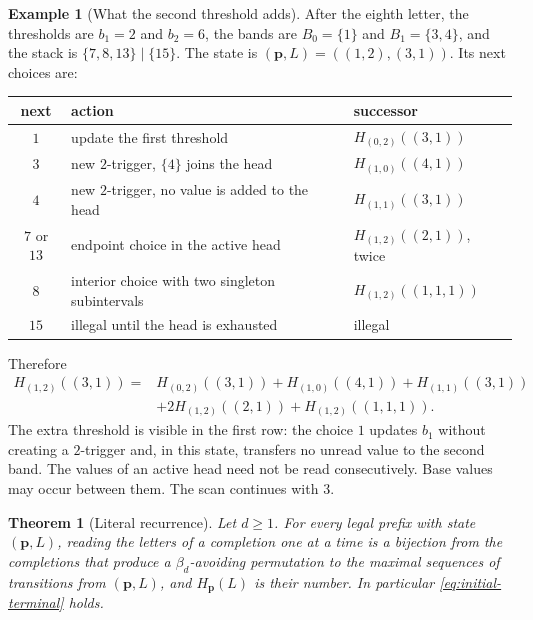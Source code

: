 \documentclass[11pt,reqno]{amsart}
\newtheorem{theorem}{Theorem}[section]
\theoremstyle{definition}
\newtheorem{example}[example]{Example}
\theoremstyle{remark}
\begin{document}
\begin{example}[What the second threshold adds]
After the eighth letter, the thresholds are $b_1=2$ and $b_2=6$, the bands
are $B_0=\{1\}$ and $B_1=\{3,4\}$, and the stack is $\{7,8,13\}\mid\{15\}$.
The state is $(\mathbf p,L)=((1,2),(3,1))$.  Its next choices are:
\begin{center}
\small
\begin{tabular}{@{}c>{\raggedright\arraybackslash}p{6.5cm}l@{}}
\toprule
next & action & successor \\
\midrule
$1$ & update the first threshold & $H_{(0,2)}((3,1))$ \\
$3$ & new $2$-trigger, $\{4\}$ joins the head
    & $H_{(1,0)}((4,1))$ \\
$4$ & new $2$-trigger, no value is added to the head
    & $H_{(1,1)}((3,1))$ \\
$7$ or $13$ & endpoint choice in the active head
    & $H_{(1,2)}((2,1))$, twice \\
$8$ & interior choice with two singleton subintervals
    & $H_{(1,2)}((1,1,1))$ \\
$15$ & illegal until the head is exhausted
    & illegal \\
\bottomrule
\end{tabular}
\end{center}
Therefore
\begin{align*}
 H_{(1,2)}((3,1))={}&H_{(0,2)}((3,1))+H_{(1,0)}((4,1))
 +H_{(1,1)}((3,1))\\
 &+2H_{(1,2)}((2,1))+H_{(1,2)}((1,1,1)).
\end{align*}
The extra threshold is visible in the first row: the choice $1$ updates
$b_1$ without creating a $2$-trigger and, in this state, transfers no unread
value to the second band.
The values of an active head need not be read consecutively.  Base values may
occur between them.  The scan continues with $3$.
\end{example}

\begin{theorem}[Literal recurrence]\label{thm:literal}
Let $d\geq1$.  For every legal prefix with state $(\mathbf p,L)$, reading the
letters of a completion one at a time is a bijection from the completions
that produce a $\beta_d$-avoiding permutation to the maximal sequences of
transitions from $(\mathbf p,L)$, and $H_{\mathbf p}(L)$ is their number.  In
particular \eqref{eq:initial-terminal} holds.
\end{theorem}
\end{document}
